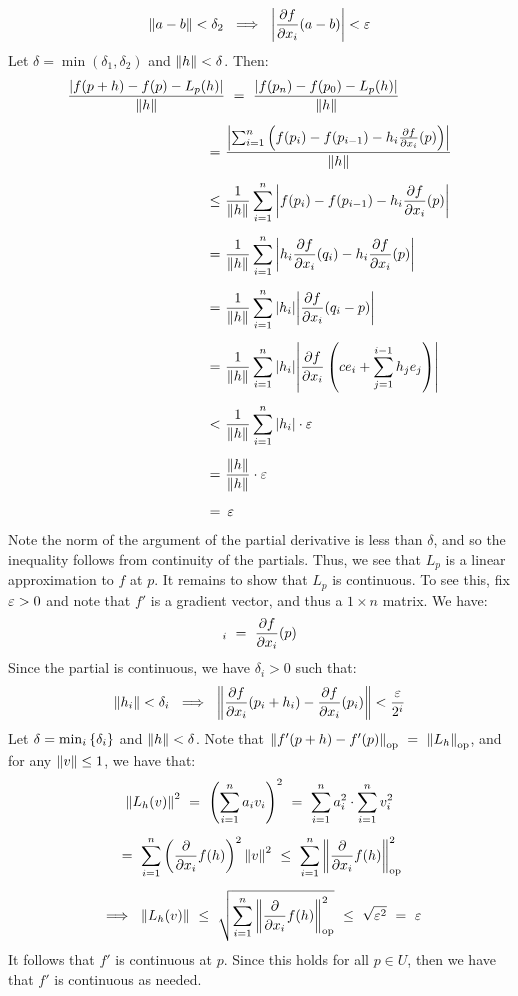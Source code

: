 \begin{pf}[title=Backward direction]
\begin{equation*}
        \norm{a-b}<\delta_{2} \ \implies \ \abs{\frac{\p f}{\p x_{i}}(a-b)}<\ep
    \end{equation*}
    Let $ \delta = \min(\delta_{1},\delta_{2}) $ and $ \left\|h\right\| < \delta $. Then:
    \begin{align*}
        \frac{\abs{f(p+h)-f(p)-L_{p}(h)}}{\norm{h}} & \ = \
        \frac{\abs{f(p_{n})-f(p_{0})-L_{p}(h)}}{\norm{h}} \vsp
        \ = \ & \frac{\abs{\sum_{i=1}^{n}\left( f(p_{i})-f(p_{i-1})-h_{i}
        \frac{\p f}{\p x_{i}}(p)\right)}}{\norm{h}} \vsp
        \ \leq \ & \frac{1}{\norm{h}}\sum_{i=1}^{n}\abs{f(p_{i})-f(p_{i-1})-
        h_{i}\frac{\p f}{\p x_{i}}(p)} \vsp
        \ = \ & \frac{1}{\norm{h}}\sum_{i=1}^{n}\abs{h_{i}\frac{\p f}{\p x_{i}}
        (q_{i})-h_{i}\frac{\p f}{\p x_{i}}(p)} \vsp
        \ = \ & \frac{1}{\norm{h}}\sum_{i=1}^{n}\abs{h_{i}}\abs{\frac{\p f}
        {\p x_{i}}(q_{i}-p)} \vsp
        \ = \ & \frac{1}{\norm{h}}\sum_{i=1}^{n}\abs{h_{i}}\abs{\frac{\p f}
        {\p x_{i}}\left( ce_{i}+\sum_{j=1}^{i-1}h_{j}e_{j} \right)} \vsp
        \ < \ & \frac{1}{\norm{h}}\sum_{i=1}^{n}\abs{h_{i}}\cdot\ep \vsp
        \ = \ & \frac{\norm{h}}{\norm{h}}\cdot\ep \vsp
        \ = \ & \ep
    \end{align*}
    Note the norm of the argument of the partial derivative is less than
    $ \delta $, and so the inequality follows from continuity of the partials.
    Thus, we see that $ L_{p} $ is a linear approximation to $ f $ at $ p $. \vsp
    It remains to show that $ L_{p} $ is continuous. To see this, fix $ \operatorname{\varepsilon} > 0 $
    and note that $ f' $ is a gradient vector, and thus a $ 1\times n $ matrix.
    We have:
    \begin{equation*}
        [L_{p}]_{i} \ = \ \frac{\p f}{\p x_{i}}(p)
    \end{equation*}
    Since the partial is continuous, we have $ \delta_{i} > 0 $ such that:
    \begin{equation*}
        \norm{h_{i}} < \delta_{i} \ \implies \
        \norm{\frac{\p f}{\p x_{i}}(p_{i}+h_{i}) - \frac{\p f}{\p x_{i}}(p_{i})}
        < \frac{\ep}{2^{i}}
    \end{equation*}
    Let $ \delta = \min_{i}\left\{{\delta_{i}}\right\} $ and $ \left\|h\right\|<\delta $. Note that
    $ \norm{f'(p+h)-f'(p)}_{\trm{op}} \ = \ \norm{L_{h}}_{\trm{op}} $, and for
    any $ \left\|v\right\| \leq 1 $, we have that:
    \begin{gather*}
        \norm{L_{h}(v)}^{2} \ = \ \left( \sum_{i=1}^{n}a_{i}v_{i} \right)^{2}
        \ = \ \sum_{i=1}^{n}a_{i}^{2}\cdot\sum_{i=1}^{n}v_{i}^{2} \vsp
        \ = \ \sum_{i=1}^{n}\left(\frac{\p}{\p x_{i}}f(h)\right)^{2}\norm{v}^{2}
        \ \leq \ \sum_{i=1}^{n}\norm{\frac{\p}{\p x_{i}}f(h)}_{\trm{op}}^{2} \vsp
        \ \implies \ \norm{L_{h}(v)} \ \leq \
        \sqrt{\sum_{i=1}^{n}\norm{\frac{\p}{\p x_{i}}f(h)}^{2}_{\trm{op}}}
        \ \leq \ \sqrt{\ep^{2}} \ = \ \ep
    \end{gather*}
    It follows that $ f' $ is continuous at $ p $. Since this holds for all
    $ p \in U $, then we have that $ f' $ is continuous as needed.
\end{pf}

